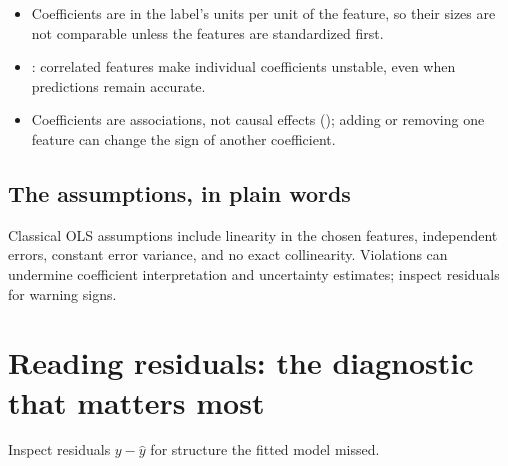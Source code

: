\begin{itemize}
  \item Coefficients are in the label's units per unit of the feature, so their sizes are not comparable unless the features are standardized first.
  \item {}: correlated features make individual coefficients unstable, even when predictions remain accurate.
  \item Coefficients are associations, not causal effects (); adding or removing one feature can change the sign of another coefficient.
\end{itemize}

\subsection{The assumptions, in plain words}

Classical OLS assumptions include linearity in the chosen features, independent errors, constant error variance, and no exact collinearity. Violations can undermine coefficient interpretation and uncertainty estimates; inspect residuals for warning signs.

\section{Reading residuals: the diagnostic that matters most}

Inspect residuals $y-\hat y$ for structure the fitted model missed.

